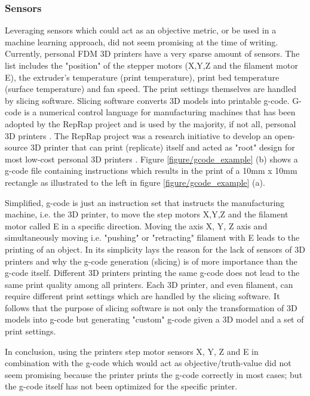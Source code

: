\subsubsection{Sensors}
Leveraging sensors which could act as an objective metric, or be used in a machine learning approach, did not seem promising at the time of writing. Currently, personal FDM 3D printers have a very sparse amount of sensors. The list includes the "position" of the stepper motors (X,Y,Z and the filament motor E), the extruder's temperature (print temperature), print bed temperature (surface temperature) and fan speed. The print settings themselves are handled by slicing software. Slicing software converts 3D models into printable g-code. G-code is a numerical control language for manufacturing machines that has been adopted by the RepRap project and is used by the majority, if not all, personal 3D printers \cite{gcodeRepRap}. The RepRap project was a research initiative to develop an open-source 3D printer that can print (replicate) itself and acted as "root" design for most low-cost personal 3D printers \cite{jones2011reprap}. Figure \ref{figure/gcode_example} (b) shows a g-code file containing instructions which results in the print of a 10mm x 10mm rectangle as illustrated to the left in figure \ref{figure/gcode_example} (a).

Simplified, g-code is just an instruction set that instructs the manufacturing machine, i.e. the 3D printer, to move the step motors X,Y,Z and the filament motor called E in a specific direction. Moving the axis X, Y, Z axis and simultaneously moving i.e. "pushing" or "retracting" filament with E leads to the printing of an object. In its simplicity lays the reason for the lack of sensors of 3D printers and why the g-code generation (slicing) is of more importance than the g-code itself. Different 3D printers printing the same g-code does not lead to the same print quality among all printers. Each 3D printer, and even filament, can require different print settings which are handled by the slicing software. It follows that the purpose of slicing software is not only the transformation of 3D models into g-code but generating "custom" g-code given a 3D model and a set of print settings. 

In conclusion, using the printers step motor sensors X, Y, Z and E in combination with the g-code which would act as objective/truth-value did not seem promising because the printer prints the g-code correctly in most cases; but the g-code itself has not been optimized for the specific printer.


